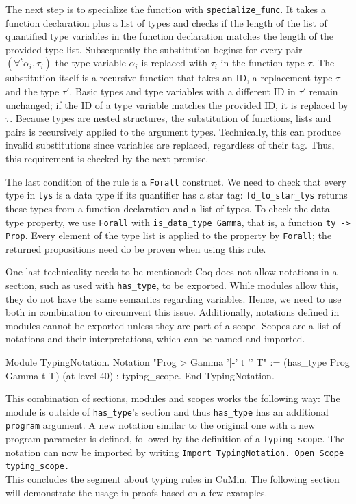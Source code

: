 \documentclass[fleqn, abstract=on]{scrreprt}
\newcommand{\coqinline}[1]{\texttt{#1}}
\begin{document}
 \par
 The next step is to specialize the function with \coqinline{specialize_func}. It takes a function declaration plus a list of types and checks if the length of the list of quantified type variables in the function declaration matches the length of the provided type list. Subsequently the substitution begins: for every pair $(\forall^{t}\alpha_{i}, \tau_{i})$ the type variable $\alpha_{i}$ is replaced with $\tau_{i}$ in the function type $\tau$. The substitution itself is a recursive function that takes an ID, a replacement type $\tau$ and the type $\tau'$. Basic types and type variables with a different ID in $\tau'$ remain unchanged; if the ID of a type variable matches the provided ID, it is replaced by $\tau$. Because types are nested structures, the substitution of functions, lists and pairs is recursively applied to the argument types. Technically, this can produce invalid substitutions since variables are replaced, regardless of their tag. Thus, this requirement is checked by the next premise.
 \par
 The last condition of the rule is a \coqinline{Forall} construct. We need to check that every type in \coqinline{tys} is a data type if its quantifier has a star tag: \coqinline{fd_to_star_tys} returns these types from a function declaration and a list of types. To check the data type property, we use \coqinline{Forall} with \coqinline{is_data_type Gamma}, that is, a function \coqinline{ty -> Prop}. Every element of the type list is applied to the property by \coqinline{Forall}; the returned propositions need do be proven when using this rule.
 \par
 One last technicality needs to be mentioned: Coq does not allow notations in a section, such as used with \coqinline{has_type}, to be exported. While modules allow this, they do not have the same semantics regarding variables. Hence, we need to use both in combination to circumvent this issue. Additionally, notations defined in modules cannot be exported unless they are part of a scope. Scopes are a list of notations and their interpretations, which can be named and imported.
 \begin{coqcode}
 Module TypingNotation.
   Notation "Prog > Gamma '|-' t '\in' T" := (has_type Prog Gamma t T)
   (at level 40) : typing_scope.
 End TypingNotation.
 \end{coqcode}
 This combination of sections, modules and scopes works the following way: The module is outside of \coqinline{has_type}'s section and thus \coqinline{has_type} has an additional \coqinline{program} argument. A new notation similar to the original one with a new program parameter is defined, followed by the definition of a \coqinline{typing_scope}.
 The notation can now be imported by writing \coqinline{Import TypingNotation. Open Scope typing_scope.}\\
 This concludes the segment about typing rules in CuMin. The following section will demonstrate the usage in proofs based on a few examples.
\end{document}
